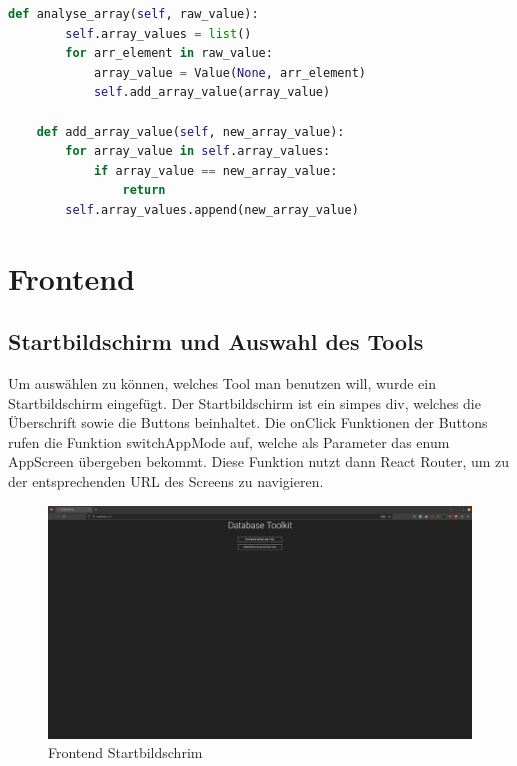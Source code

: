 \begin{lstlisting}[language=python, caption={Value.analyse\_array},label={lst:backend_value_analyse_array}]
    def analyse_array(self, raw_value):
        self.array_values = list()
        for arr_element in raw_value:
            array_value = Value(None, arr_element)
            self.add_array_value(array_value)

    def add_array_value(self, new_array_value):
        for array_value in self.array_values:
            if array_value == new_array_value:
                return
        self.array_values.append(new_array_value)
\end{lstlisting}

\section{Frontend}
\label{sec:frontend}

\subsection{Startbildschirm und Auswahl des Tools}
\label{sub:fe_startbildschirm}

Um auswählen zu können, welches Tool man benutzen will, wurde ein Startbildschirm eingefügt.
Der Startbildschirm ist ein simpes div, welches die Überschrift sowie die Buttons beinhaltet.
Die onClick Funktionen der Buttons rufen die Funktion switchAppMode auf, welche als Parameter das enum AppScreen übergeben bekommt.
Diese Funktion nutzt dann React Router, um zu der entsprechenden URL des Screens zu navigieren.

\begin{figure}[H]
    \includegraphics[width=\textwidth]{images/frontend_titlescreen}
    \caption{Frontend Startbildschrim}
    \label{fig:frontend_titlescreen}
\end{figure}

